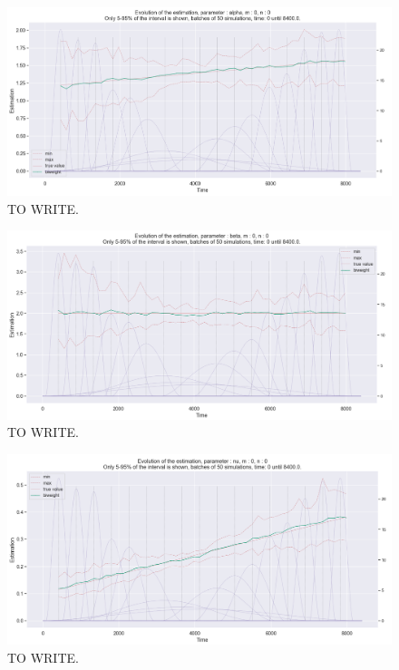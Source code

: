 \begin{figure}
\centering
\includegraphics[width = 0.90 \textwidth]{../imag/chap3/2/Figure_10.png}
\caption{TO WRITE.}
\label{fig:second_estimate_2_alpha}
\end{figure}

\begin{figure}
\centering
\includegraphics[width = 0.90 \textwidth]{../imag/chap3/2/Figure_11.png}
\caption{TO WRITE.}
\label{fig:second_estimate_2_beta}
\end{figure}

\begin{figure}
\centering
\includegraphics[width = 0.90 \textwidth]{../imag/chap3/2/Figure_12.png}
\caption{TO WRITE.}
\label{fig:second_estimate_2_nu}
\end{figure}















